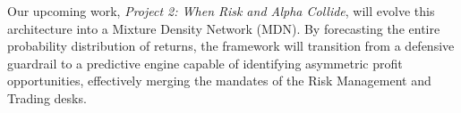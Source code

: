 Our upcoming work, \textit{Project 2: When Risk and Alpha Collide}, will evolve this architecture into a Mixture Density Network (MDN). By forecasting the entire probability distribution of returns, the framework will transition from a defensive guardrail to a predictive engine capable of identifying asymmetric profit opportunities, effectively merging the mandates of the Risk Management and Trading desks.